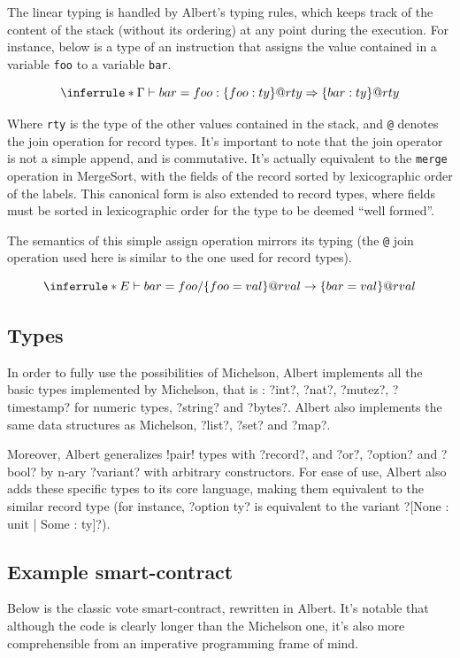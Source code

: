 \documentclass{report}
\begin{document}
The linear typing is handled by Albert's typing rules, which keeps track of the content of the stack (without its ordering) at any point during the execution. For instance, below is a type of an instruction that assigns the value contained in a variable \texttt{foo} to a variable \texttt{bar}.

$$
\inferrule*
    { }
    { \Gamma \vdash bar = foo : \{ foo : ty \} @ rty \Rightarrow \{ bar : ty \} @ rty }
$$

    Where \texttt{rty} is the type of the other values contained in the stack, and \texttt{@} denotes the join operation for record types. It's important to note that the join operator is not a simple append, and is commutative. It's actually equivalent to the \texttt{merge} operation in MergeSort, with the fields of the record sorted by lexicographic order of the labels. This canonical form is also extended to record types, where fields must be sorted in lexicographic order for the type to be deemed ``well formed''.

The semantics of this simple assign operation mirrors its typing (the \texttt{@} join operation used here is similar to the one used for record types).

$$
\inferrule*
    { }
    { E \vdash bar = foo / \{ foo = val \} @ rval \rightarrow \{ bar = val \} @ rval }
    $$

\subsection{Types}

In order to fully use the possibilities of Michelson, Albert implements all the basic types implemented by Michelson, that is : ?int?, ?nat?, ?mutez?, ?timestamp? for numeric types, ?string? and ?bytes?. Albert also implements the same data structures as Michelson, ?list?, ?set? and ?map?.

Moreover, Albert generalizes !pair! types with ?record?, and ?or?, ?option? and ?bool? by n-ary ?variant? with arbitrary constructors. For ease of use, Albert also adds these specific types to its core language, making them equivalent to the similar record type (for instance, ?option ty? is equivalent to the variant ?[None : unit | Some : ty]?).

\subsection{Example smart-contract}

Below is the classic vote smart-contract, rewritten in Albert. It's notable that although the code is clearly longer than the Michelson one, it's also more comprehensible from an imperative programming frame of mind.
\end{document}
